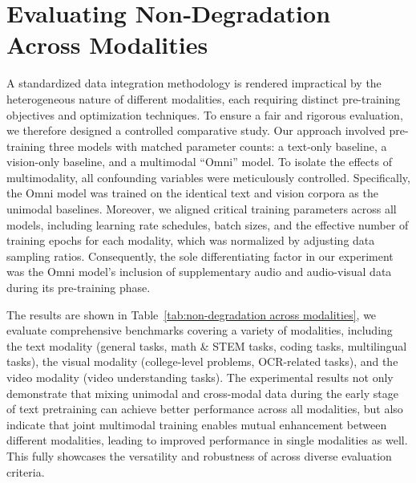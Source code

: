 \section{Evaluating Non‑Degradation Across Modalities}\label{sec:omniexp}
A standardized data integration methodology is rendered impractical by the heterogeneous nature of different modalities, each requiring distinct pre-training objectives and optimization techniques. To ensure a fair and rigorous evaluation, we therefore designed a controlled comparative study. Our approach involved pre-training three models with matched parameter counts: a text-only baseline, a vision-only baseline, and a multimodal ``Omni'' model. To isolate the effects of multimodality, all confounding variables were meticulously controlled. Specifically, the Omni model was trained on the identical text and vision corpora as the unimodal baselines. Moreover, we aligned critical training parameters across all models, including learning rate schedules, batch sizes, and the effective number of training epochs for each modality, which was normalized by adjusting data sampling ratios. Consequently, the sole differentiating factor in our experiment was the Omni model's inclusion of supplementary audio and audio-visual data during its pre-training phase.


The results are shown in Table~\ref{tab:non-degradation across modalities}, we evaluate comprehensive benchmarks covering a variety of modalities, including the text modality (general tasks, math \& STEM tasks, coding tasks, multilingual tasks), the visual modality (college-level problems, OCR-related tasks), and the video modality (video understanding tasks). The experimental results not only demonstrate that mixing unimodal and cross-modal data during the early stage of text pretraining can achieve better performance across all modalities, but also indicate that joint multimodal training enables mutual enhancement between different modalities, leading to improved performance in single modalities as well. 
This fully showcases the versatility and robustness of \method across diverse evaluation criteria.


